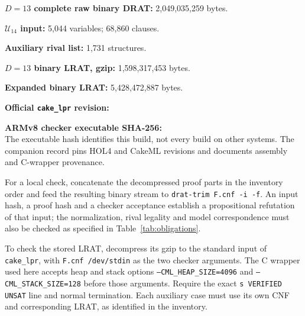 \documentclass[11pt,a4paper]{article}
\theoremstyle{definition}
\newcommand{\U}{\mathcal U_{14}}
\begin{document}
\medskip\noindent\textbf{$D=13$ complete raw binary DRAT:}
2,049,035,259 bytes.\\

\medskip\noindent\textbf{$\U$ input:} 5,044 variables; 68,860 clauses.\\

\medskip\noindent\textbf{Auxiliary rival list:} 1,731 structures.\\

\medskip\noindent\textbf{$D=13$ binary LRAT, gzip:}
1,598,317,453 bytes.\\

\medskip\noindent\textbf{Expanded binary LRAT:} 5,428,472,887 bytes.\\

\medskip\noindent\textbf{Official \texttt{cake\_lpr} revision:}\\

\medskip\noindent\textbf{ARMv8 checker executable SHA-256:}\\
The executable hash identifies this build, not every build on other
systems. The companion record pins HOL4 and CakeML revisions and
documents assembly and C-wrapper provenance.
\endgroup

\medskip
For a local check, concatenate the decompressed proof parts in the
inventory order and feed the resulting binary stream to
\texttt{drat-trim F.cnf -i -f}. An input hash, a proof hash and a checker
acceptance establish a propositional refutation of that input; the
normalization, rival legality and model correspondence must also be
checked as specified in Table~\ref{tab:obligations}.

To check the stored LRAT, decompress its gzip to the standard input of
\texttt{cake\_lpr}, with \texttt{F.cnf /dev/stdin} as the two checker
arguments. The C wrapper used here accepts heap and stack options
\texttt{--CML\_HEAP\_SIZE=4096} and \texttt{--CML\_STACK\_SIZE=128} before
those arguments. Require the exact \texttt{s VERIFIED UNSAT} line and
normal termination. Each auxiliary case must use its own CNF and
corresponding LRAT, as identified in the inventory.
\end{document}
